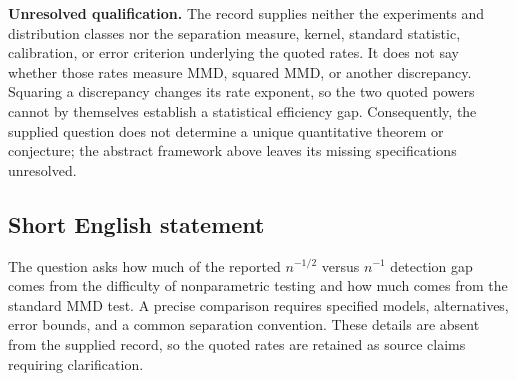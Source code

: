 \documentclass[11pt]{article}
\begin{document}
\textbf{Unresolved qualification.} The record supplies neither the experiments and distribution classes nor the separation measure, kernel, standard statistic, calibration, or error criterion underlying the quoted rates. It does not say whether those rates measure MMD, squared MMD, or another discrepancy. Squaring a discrepancy changes its rate exponent, so the two quoted powers cannot by themselves establish a statistical efficiency gap. Consequently, the supplied question does not determine a unique quantitative theorem or conjecture; the abstract framework above leaves its missing specifications unresolved.
\subsection{Short English statement}
The question asks how much of the reported \(n^{-1/2}\) versus \(n^{-1}\) detection gap comes from the difficulty of nonparametric testing and how much comes from the standard MMD test. A precise comparison requires specified models, alternatives, error bounds, and a common separation convention. These details are absent from the supplied record, so the quoted rates are retained as source claims requiring clarification.
\end{document}
